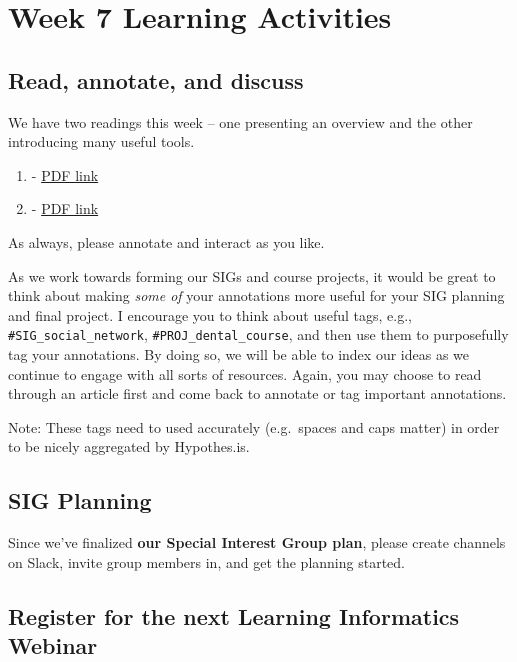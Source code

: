 \documentclass[
]{book}
\providecommand{\tightlist}{%
  \setlength{\itemsep}{0pt}\setlength{\parskip}{0pt}}
\begin{document}
\hypertarget{week-7-learning-activities}{%
\section{Week 7 Learning Activities}\label{week-7-learning-activities}}

\hypertarget{read-annotate-and-discuss}{%
\subsection{Read, annotate, and discuss}\label{read-annotate-and-discuss}}

We have two readings this week -- one presenting an overview and the other introducing many useful tools.

\begin{enumerate}
\def\labelenumi{\arabic{enumi}.}
\tightlist
\item
  \citet{romero2020educational} - \href{files/Romero\%20and\%20Ventura\%20-\%202020.pdf}{PDF link}
\item
  \citet{slater2017tools} - \href{files/Slater\%20et\%20al.\%20-\%202017.pdf}{PDF link}
\end{enumerate}

As always, please annotate and interact as you like.

As we work towards forming our SIGs and course projects, it would be great to think about making \emph{some of} your annotations more useful for your SIG planning and final project. I encourage you to think about useful tags, e.g., \texttt{\#SIG\_social\_network}, \texttt{\#PROJ\_dental\_course}, and then use them to purposefully tag your annotations. By doing so, we will be able to index our ideas as we continue to engage with all sorts of resources. Again, you may choose to read through an article first and come back to annotate or tag important annotations.

Note: These tags need to used accurately (e.g.~spaces and caps matter) in order to be nicely aggregated by Hypothes.is.

\hypertarget{sig-planning}{%
\subsection{SIG Planning}\label{sig-planning}}

Since we've finalized \textbf{our Special Interest Group plan}, please create channels on Slack, invite group members in, and get the planning started.

\hypertarget{register-for-the-next-learning-informatics-webinar}{%
\subsection{Register for the next Learning Informatics Webinar}\label{register-for-the-next-learning-informatics-webinar}}
\end{document}
